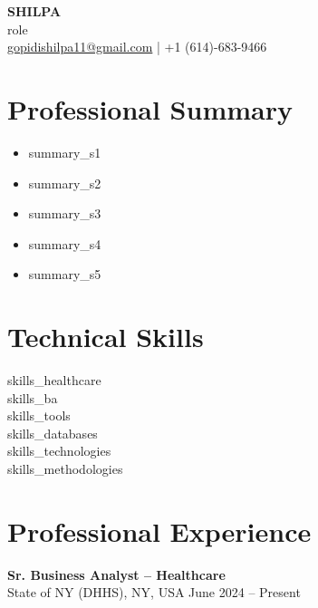 \documentclass[a4paper,10pt]{article}
\begin{document}
\begin{center}
    {\LARGE \textbf{SHILPA}}\\[5pt]
    {{role}}\\
    \href{mailto:gopidishilpa11@gmail.com}{gopidishilpa11@gmail.com} \;|\;
    +1 (614)-683-9466
\end{center}


\section*{Professional Summary}

\begin{itemize}[leftmargin=*]
\item {{summary_s1}}
\item {{summary_s2}}
\item {{summary_s3}}
\item {{summary_s4}}
\item {{summary_s5}}
\end{itemize}


\section*{Technical Skills}

\begin{itemize}[leftmargin=0.15in, label={}]
    \small{\item{
     {{skills_healthcare}} \\
     {{skills_ba}} \\
     {{skills_tools}} \\
     {{skills_databases}} \\
     {{skills_technologies}} \\
     {{skills_methodologies}}
    }}
\end{itemize}


\section*{Professional Experience}

\textbf{Sr. Business Analyst -- Healthcare}\\
State of NY (DHHS), NY, USA \hfill June 2024 -- Present
\end{document}

